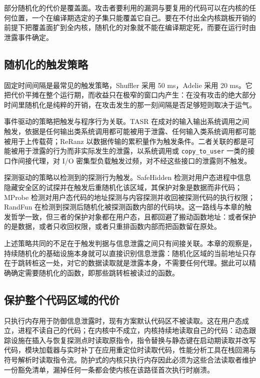 部分随机化的代价是覆盖面。攻击者要利用的漏洞与要复用的代码可以在内核的任何位置，一个在编译期选定的子集只能覆盖它自己。要在不付出全内核跳板开销的前提下把覆盖面扩到全内核，随机化的对象就不能在编译期定死，而要在运行时由泄露事件确定。

\subsection{随机化的触发策略}

固定时间间隔是最常见的触发策略，Shuffler\citep{williams2016shuffler} 采用 50 ms，Adelie 采用 20 ms。它把代价平摊在整个运行期，而收益只在极窄的窗口内产生：在没有攻击的绝大部分时间里随机化是纯粹的开销，在攻击发生的那一刻间隔是否足够短则取决于运气。

事件驱动的策略把触发与程序行为关联。TASR\citep{bigelow2015tasr} 在成对的输入输出系统调用之间触发，依据是任何输出类系统调用都可能被用于泄露、任何输入类系统调用都可能被用于上传载荷；ReRanz\citep{wang2017reranz} 以数据传输的累积量作为触发条件。二者关联的都是可能被用于泄露的行为而非实际发生的泄露，以系统调用或 \lstinline[breaklines=false]@copy_to_user@ 一类的接口作间接代理，对 I/O 密集型负载触发过频，对不经这些接口的泄露则不触发。

探测驱动的策略以检测到的探测行为触发。SafeHidden\citep{wang2019safehidden} 检测对用户态进程中信息隐藏安全区的试探并在触发后重随机化该区域，其保护对象是数据而非代码；MProbe\citep{li2022mprobe} 检测对用户态代码的地址探测与内容探测并收回被探测代码的执行权限；RandFun\citep{li2024randomize} 在检测到探测后随机化被探测函数内部的代码块。这一路线与本章的触发哲学一致，但三者的保护对象都在用户态，且都回避了搬动函数地址：或者保护的是数据，或者只收回权限，或者只重排函数内部而把函数留在原处。

上述策略共同的不足在于触发判据与信息泄露之间只有间接关联。本章的观察是，持续随机化的基础设施本身就可以直接识别信息泄露：随机化区域的当前地址只存在于跳转桩这一处，对它的数据读取就是泄露本身，不需要任何代理。据此可以精确确定需要随机化的函数，即那些跳转桩被读过的函数。

\subsection{保护整个代码区域的代价}

只执行内存用于防御信息泄露时，现有方案默认代码区不被读取。这在用户态成立，进程不读自己的代码；在内核中不成立，内核持续地读取自己的代码：动态跟踪设施在插入与恢复探测点时读取原指令，指令替换与静态键在启动期读取并改写代码，模块加载器与实时补丁在应用重定位时读取代码，性能分析工具在栈回溯与符号解析时读取指令流。防护式的内核只执行内存因此必须为这些合法读取者维护一份豁免清单，漏掉任何一条都会使内核在该路径首次执行时崩溃。

